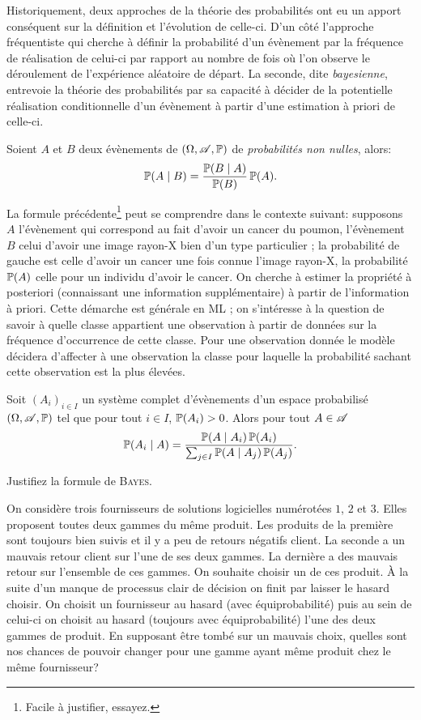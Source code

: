 \documentclass[11pt, a4paper]{article}
\begin{document}
Historiquement, deux approches de la théorie des probabilités ont eu
un apport conséquent sur la définition et l'évolution de
celle-ci. D'un côté l'approche fréquentiste qui cherche à définir la
probabilité d'un évènement par la fréquence de réalisation de celui-ci
par rapport au nombre de fois où l'on observe le déroulement de
l'expérience aléatoire de départ. La seconde, dite
\textit{bayesienne}, entrevoie la théorie des probabilités par sa
capacité à décider de la potentielle réalisation conditionnelle d'un
évènement à partir d'une estimation à priori de celle-ci.
\begin{prop}
  Soient $A$ et $B$ deux évènements de $(\Omega, \mathscr{A}, \operatorname{\mathbb{P}})$ de
  \textit{probabilités non nulles}, alors:
  \[
    \operatorname{\mathbb{P}}(A \mid B) = \frac{\operatorname{\mathbb{P}}(B \mid A)}{\operatorname{\mathbb{P}}(B)} \operatorname{\mathbb{P}}(A).
  \]
\end{prop}
La formule précédente\footnote{Facile à justifier, essayez.} peut se
comprendre dans le contexte suivant: supposons $A$ l'évènement qui
correspond au fait d'avoir un cancer du poumon, l'évènement $B$ celui
d'avoir une image rayon-X bien d'un type particulier ; la
probabilité de gauche est celle d'avoir un cancer une fois connue
l'image rayon-X, la probabilité $\operatorname{\mathbb{P}}(A)$ celle pour un individu
d'avoir le cancer. On cherche à estimer la propriété à posteriori
(connaissant une information supplémentaire) à partir de l'information
à priori. Cette démarche est générale en ML ; on s'intéresse à la
question de savoir à quelle classe appartient une observation à partir
de données sur la fréquence d'occurrence de cette classe. Pour une
observation donnée le modèle décidera d'affecter à une observation la
classe pour laquelle la probabilité sachant cette observation est la
plus élevées.
\begin{prop}
  Soit $(A_i)_{i \in I}$ un système complet d'évènements d'un espace
  probabilisé $(\Omega, \mathscr{A}, \operatorname{\mathbb{P}})$ tel que pour tout $i \in I$,
  $\operatorname{\mathbb{P}}(A_i) > 0$. Alors pour tout $A \in \mathscr{A}$
  \[
    \operatorname{\mathbb{P}}(A_i \mid A) = \frac{\operatorname{\mathbb{P}}(A \mid A_i)\operatorname{\mathbb{P}}(A_i)}{\sum_{j \in
        I}\operatorname{\mathbb{P}}(A\mid A_j)\operatorname{\mathbb{P}}(A_j)}.
  \]
\end{prop}
\begin{question}
  Justifiez la formule de \textsc{Bayes}.
\end{question}
\begin{question}
  On considère trois fournisseurs de solutions logicielles numérotées
  $1$, $2$ et $3$. Elles proposent toutes deux gammes du même
  produit. Les produits de la première sont toujours bien suivis et il
  y a peu de retours négatifs client. La seconde a un mauvais retour
  client sur l'une de ses deux gammes. La dernière a des mauvais
  retour sur l'ensemble de ces gammes. On souhaite choisir un de ces
  produit. À la suite d'un manque de processus clair de décision on
  finit par laisser le hasard choisir. On choisit un fournisseur au
  hasard (avec équiprobabilité) puis au sein de celui-ci on choisit au
  hasard (toujours avec équiprobabilité) l'une des deux gammes de
  produit. En supposant être tombé sur un mauvais choix, quelles sont
  nos chances de pouvoir changer pour une gamme ayant même produit
  chez le même fournisseur?
\end{question}
\end{document}
